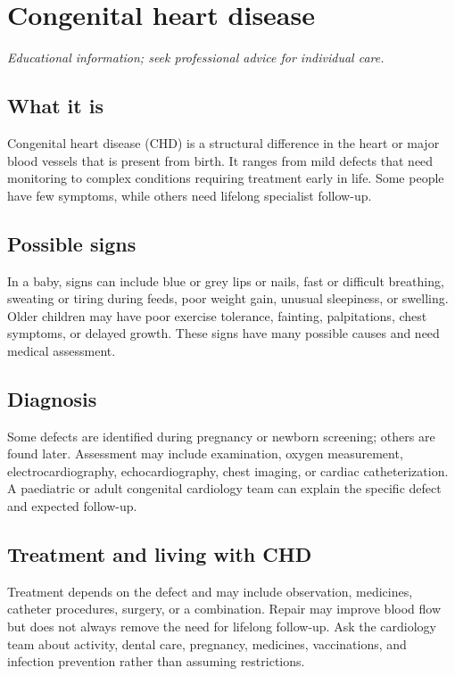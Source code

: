 \chapter{Congenital heart disease}

\medskip
\noindent\textit{Educational information; seek professional advice for individual care.}

\section*{What it is}
Congenital heart disease (CHD) is a structural difference in the heart or major blood vessels that is present from birth. It ranges from mild defects that need monitoring to complex conditions requiring treatment early in life. Some people have few symptoms, while others need lifelong specialist follow-up.

\section*{Possible signs}
In a baby, signs can include blue or grey lips or nails, fast or difficult breathing, sweating or tiring during feeds, poor weight gain, unusual sleepiness, or swelling. Older children may have poor exercise tolerance, fainting, palpitations, chest symptoms, or delayed growth. These signs have many possible causes and need medical assessment.

\section*{Diagnosis}
Some defects are identified during pregnancy or newborn screening; others are found later. Assessment may include examination, oxygen measurement, electrocardiography, echocardiography, chest imaging, or cardiac catheterization. A paediatric or adult congenital cardiology team can explain the specific defect and expected follow-up.

\section*{Treatment and living with CHD}
Treatment depends on the defect and may include observation, medicines, catheter procedures, surgery, or a combination. Repair may improve blood flow but does not always remove the need for lifelong follow-up. Ask the cardiology team about activity, dental care, pregnancy, medicines, vaccinations, and infection prevention rather than assuming restrictions.

